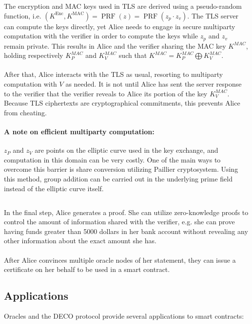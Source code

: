 \documentclass[twoside]{article}
\begin{document}
	The encryption and MAC keys used in TLS are derived using a pseudo-random function, i.e. $(K^{\operatorname{Enc}}, K^{\operatorname{MAC}}) = \operatorname{PRF}(z)= \operatorname{PRF}(z_p\cdot z_v)$. The TLS server can compute the keys directly, yet Alice needs to engage in secure multiparty computation with the verifier in order to compute the keys while $z_p$ and $z_v$ remain private. This results in Alice and the verifier sharing the MAC key $K^{MAC}$, holding respectively $K^{MAC}_P$ and $K^{MAC}_V$ such that $K^{MAC} = K^{MAC}_P \bigoplus K^{MAC}_V$.
	\paragraph{}
	After that, Alice interacts with the TLS as usual, resorting to multiparty computation with $V$ as needed. It is not until Alice has sent the server response to the verifier that the verifier reveals to Alice its portion of the key $K^{MAC}_V$. Because TLS ciphertexts are cryptographical commitments, this prevents Alice from cheating.
	
	\paragraph{A note on efficient multiparty computation:} 
	$z_P$ and $z_V$ are points on the elliptic curve used in the key exchange, and computation in this domain can be very costly. One of the main ways to overcome this barrier is share conversion utilizing Paillier cryptosystem. Using this method, group addition can be carried out in the underlying prime field instead of the elliptic curve itself.
	
	\subsection{}
	In the final step, Alice generates a proof. She can utilize zero-knowledge proofs to control the amount of information shared with the verifier, e.g. she can prove having funds greater than 5000 dollars in her bank account without revealing any other information about the exact amount she has.
	\noindent \\ \\
	After Alice convinces multiple oracle nodes of her statement, they can issue a certificate on her behalf to be used in a smart contract.
	
	\subsection{Applications}
	Oracles and the DECO protocol provide several applications to smart contracts:
	
\end{document}
